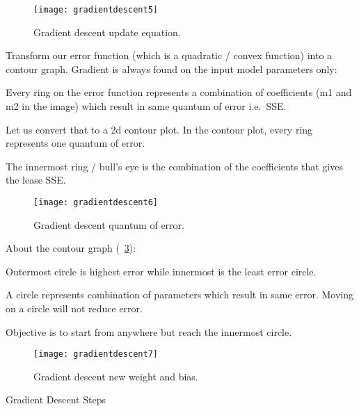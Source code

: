 	\begin{figure}[h]
		\centering
		\texttt{[image: gradientdescent5]}
		\caption[Gradient descent update equation]{Gradient descent update equation.}
		\label{fig:gradientdescent5}
	\end{figure}


Transform our error function (which is a quadratic / convex function) into a contour graph. Gradient is
always found on the input model parameters only:

	\begin{bulletedlist}
		\item Every ring on the error function represents a combination of coefficients (m1 and m2 in the image) which result in same quantum of error i.e.\ SSE.
		\item Let us convert that to a 2d contour plot. In the contour plot, every ring represents one quantum of error.
		\item The innermost ring / bull's eye is the combination of the coefficients that gives the lease SSE.
	\end{bulletedlist}

	\begin{figure}[h]
		\centering
		\texttt{[image: gradientdescent6]}
		\caption[Gradient descent quantum of error]{Gradient descent quantum of error.}
		\label{fig:gradientdescent6}
	\end{figure}

About the contour graph (\figurename~\ref{fig:gradientdescent7}):
	\begin{bulletedlist}
		\item Outermost circle is highest error while innermost is the least error circle.
		\item A circle represents combination of parameters which result in same error. Moving on a circle will not reduce error.
		\item Objective is to start from anywhere but reach the innermost circle.
	\end{bulletedlist}

	\begin{figure}[h]
		\centering
		\texttt{[image: gradientdescent7]}
		\caption[Gradient descent new weight and bias]{Gradient descent new weight and bias.}
		\label{fig:gradientdescent7}
	\end{figure}


Gradient Descent Steps

